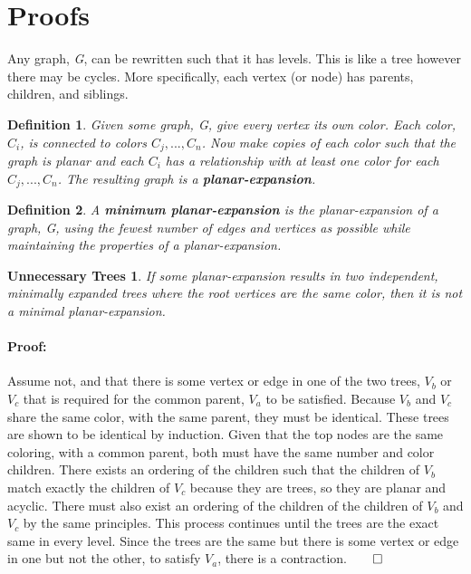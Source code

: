 \documentclass{article}
\newtheorem*{trees}{Unnecessary Trees}
\newtheorem{mydef}{Definition}
\begin{document}


\section{Proofs}
Any graph, \emph{G}, can be rewritten such that it has levels.  This is like a 
tree however there may be cycles.  More specifically, each vertex (or node) has
parents, children, and siblings.\\

\theoremstyle{definition}
\begin{mydef}
Given some graph, \emph{G}, give every vertex its own color. Each color, $C_i$, 
is connected to colors $C_{j},...,C_{n}$. Now make copies of
each color such that the graph is planar and each $C_i$ has a relationship with 
at least one color for each $C_{j},...,C_{n}$.  The resulting graph is a 
\textbf{planar-expansion}.\\
\end{mydef}

\theoremstyle{definition}
\begin{mydef}
A \textbf{minimum planar-expansion} is the planar-expansion of a graph, G, using
the fewest number of edges and vertices as possible while maintaining the 
properties of a planar-expansion.\\
\end{mydef}


\begin{trees}
If some planar-expansion results in two independent, minimally expanded trees 
where the root vertices are the same color, then it is not a minimal 
planar-expansion.
\end{trees}
\paragraph{Proof: }
Assume not, and that there is some vertex or edge in one of the two trees, 
$V_b$ or $V_c$ that is required for the common parent, $V_a$ to be satisfied.
Because $V_b$ and $V_c$ share the same color, with the same parent, they must 
be identical. These trees are shown to be identical by induction.  Given that 
the top nodes are the same coloring, with a common parent, both must have the 
same number and color children.  There exists an ordering of the children such 
that the children of $V_b$ match exactly the children of $V_c$ because they are 
trees, so they are planar and acyclic.  There must also exist an ordering of 
the children of the children of $V_b$ and $V_c$ by the same principles.  This 
process continues until the trees are the exact same in every level.  Since the 
trees are the same but there is some vertex or edge in one but not the other,
to satisfy $V_a$, there is a contraction.$\qed$\\
\end{document}
